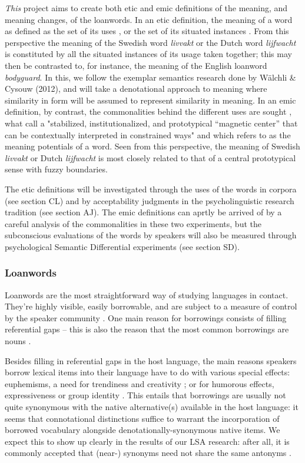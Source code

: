 \documentclass[a4paper]{article}
\begin{document}
\emph{This} project aims to create both etic and emic definitions of the meaning, and meaning changes, of the loanwords. In an etic definition, the meaning of a word as defined as the set of its uses \citep{Koptjevskaja-Tamm2008}, or the set of its situated instances \citep{Evans2009}. From this perspective the meaning of the Swedish word \emph{livvakt} or the Dutch word \emph{lijfwacht} is constituted by all the situated instances of its usage taken together; this may then be contrasted to, for instance, the meaning of the English loanword \emph{bodyguard}. In this, we follow the exemplar semantics research done by W\"alchli \& Cysouw (2012), and will take a denotational approach to meaning where similarity in form will be assumed to represent similarity in meaning. In an emic definition, by contrast, the commonalities behind the different uses are sought \citep{Koptjevskaja-Tamm2008}, what \citet{Traugott2001} call a "stabilized, institutionalized, and prototypical “magnetic center” that can be contextually interpreted in constrained ways" and which \citet{Linell2005} refers to as the meaning potentials of a word. Seen from this perspective, the meaning of Swedish \emph{livvakt} or Dutch \emph{lijfwacht} is most closely related to that of a central prototypical sense with fuzzy boundaries.

The etic definitions will be investigated through the uses of the words in corpora (see section CL) and by acceptability judgments in the psycholinguistic research tradition (see section AJ). The emic definitions can aprtly be arrived of by a careful analysis of the commonalities in these two experiments, but the subconscious evaluations of the words by speakers will also be measured through psychological Semantic Differential experiments (see section SD).




\subsubsection{Loanwords}
\label{sect_loanwords}
Loanwords are the most straightforward way of studying languages in contact. They're highly visible, easily borrowable, and are subject to a measure of control by the speaker community \citep{Thomason2001}. One main reason for borrowings consists of filling referential gaps -- this is also the reason that the most common borrowings are nouns \citep[cf.][p.168]{Matras2009}.

Besides filling in referential gaps in the host language, the main reasons speakers borrow lexical items into their language have to do with various special effects: euphemisms, a need for trendiness and creativity \citep[cf.][]{Rebuck2002}; or for humorous effects, expressiveness or group identity \citep[cf.][]{Gottlieb2006,Wennberg2010}. This entails that borrowings are usually not quite synonymous with the native alternative(s) available in the host language: it seems that connotational distinctions suffice to warrant the incorporation of borrowed vocabulary alongside denotationally-synonymous native items. We expect this to show up clearly in the results of our LSA research: after all, it is commonly accepted that (near-) synonyms need not share the same antonyms \citep[cf.][]{Miller1990}. 
\end{document}
